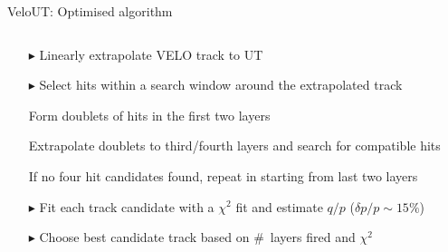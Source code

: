 \documentclass[aspectratio=1610]{beamer}
\begin{document}
\begin{frame}{VeloUT: Optimised algorithm}
\begin{columns}
\begin{column}{0.5\textwidth}
\begin{itemize}
  \item[$\blacktriangleright$] Linearly extrapolate VELO track to UT
  \item[$\blacktriangleright$] Select hits within a search window around the extrapolated track
  \item[\ding{80}] Form doublets of hits in the first two layers
  \item[\ding{80}] Extrapolate doublets to third/fourth layers and search for compatible hits
  \item[\ding{80}] If no four hit candidates found, repeat in starting from last two layers
  \item[$\blacktriangleright$] Fit each track candidate with a $\chi^{2}$ fit and estimate $q/p$ ($\delta p/p \sim 15 \%$)
  \item[$\blacktriangleright$] Choose best candidate track based on \mbox{\# layers} fired and $\chi^{2}$
  \end{itemize}
\end{column}
\begin{column}{0.5\textwidth}
\centering

\end{column}
\end{columns}
\end{frame}
\end{document}
